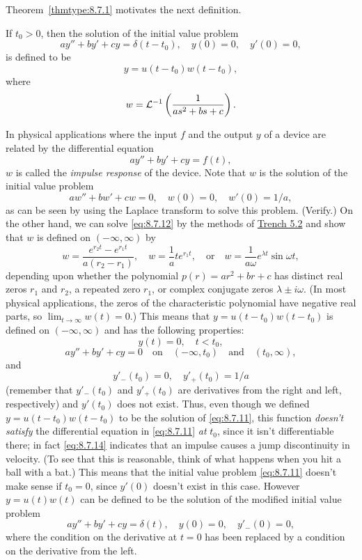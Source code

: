 \documentclass{ximera}
\begin{document}
Theorem~\ref{thmtype:8.7.1} motivates the next definition.

\begin{definition}\label{thmtype:8.7.2}
If $t_0>0$, then the solution of the initial value problem
\begin{equation} \label{eq:8.7.11}
ay''+by'+cy=\delta(t-t_0), \quad  y(0)=0,\quad y'(0)=0,
\end{equation}
is defined to be
$$
y=u(t-t_0)w(t-t_0),
$$
where
$$
w={\cal L}^{-1}\left(\frac{1}{as^2+bs+c}\right).
$$
\end{definition}

In physical applications where the input $f$ and the output $y$ of a
device are related by the differential equation
$$
ay''+by'+cy=f(t),
$$
$w$ is called the \textit{impulse response} of the device. Note
that $w$ is the solution of the initial value problem
\begin{equation} \label{eq:8.7.12}
aw''+bw'+cw=0, \quad  w(0)=0,\quad  w'(0)=1/a,
\end{equation}
as can be seen by using the Laplace transform to solve this problem.
(Verify.)
On the other hand, we can solve \eqref{eq:8.7.12} by the methods of
\href{https://ximera.osu.edu/ode/main/constantCoefficientHomogeneousEquations/constantCoefficientHomogeneousEquations}{Trench 5.2} 
and show that $w$ is defined on
$(-\infty,\infty)$ by
\begin{equation} \label{eq:8.7.13}
w=\frac{e^{r_2t}-e^{r_1t}}{a(r_2-r_1)},\quad
w=\frac{1}{a}te^{r_1t}, \quad\mbox{or}\quad
w=\frac{1}{a\omega}e^{\lambda t}\sin\omega t,
\end{equation}
depending upon whether the polynomial $p(r)=ar^2+br+c$ has distinct
real zeros $r_1$ and $r_2$, a repeated zero $r_1$, or complex
conjugate zeros $\lambda\pm i\omega$. (In most physical applications,
the zeros of the characteristic polynomial have negative real parts,
so $\lim_{t\rightarrow\infty}w(t)=0$.) This means that $y=u(t-t_0)w(t-t_0)$ is
defined on $(-\infty,\infty)$ and has the following properties:
$$
y(t)=0,\quad  t<t_0,
$$
$$
ay''+by'+cy=0\quad\mbox{on}\quad  (-\infty,t_0)\quad\mbox{and}\quad(t_0,\infty),
$$
and
\begin{equation} \label{eq:8.7.14}
y'_-(t_0)=0, \quad   y'_+(t_0)=1/a
\end{equation}
(remember that $y'_-(t_0)$ and $y'_+(t_0)$ are derivatives from the
right and left, respectively) and $y'(t_0)$ does not exist. Thus, even
though we defined $y=u(t-t_0)w(t-t_0)$ to be the solution of
\eqref{eq:8.7.11},  this function \textit{doesn't satisfy}
the differential equation in \eqref{eq:8.7.11} \textit{at} $t_0$, since it
isn't differentiable there;   in fact \eqref{eq:8.7.14} indicates that an
impulse causes a jump discontinuity in velocity. (To see that this is
reasonable, think of what happens when you hit a ball with a bat.)
This means that the initial value problem \eqref{eq:8.7.11} doesn't make
sense if $t_0=0$, since $y'(0)$ doesn't exist in this case. However
$y=u(t)w(t)$ can be defined to be the solution of the modified initial
value problem
$$
ay''+by'+cy=\delta(t), \quad  y(0)=0,\quad y'_-(0)=0,
$$
where the condition on the derivative at $t=0$ has been replaced by a
condition on the derivative from the left.
\end{document}
